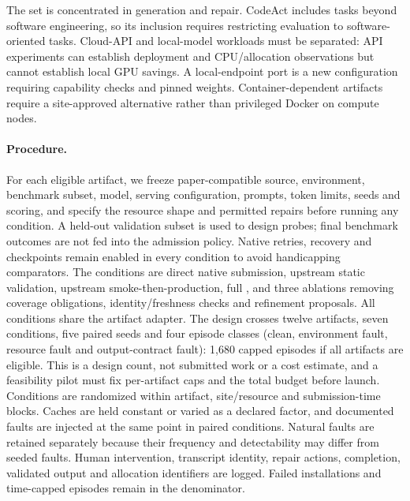 The set is concentrated in generation and repair. CodeAct includes tasks beyond software engineering, so its inclusion requires restricting evaluation to software-oriented tasks. Cloud-API and local-model workloads must be separated: API experiments can establish deployment and CPU/allocation observations but cannot establish local GPU savings. A local-endpoint port is a new configuration requiring capability checks and pinned weights. Container-dependent artifacts require a site-approved alternative rather than privileged Docker on compute nodes.

\paragraph{Procedure.} For each eligible artifact, we freeze paper-compatible source, environment, benchmark subset, model, serving configuration, prompts, token limits, seeds and scoring, and specify the resource shape and permitted repairs before running any condition. A held-out validation subset is used to design probes; final benchmark outcomes are not fed into the admission policy. Native retries, recovery and checkpoints remain enabled in every condition to avoid handicapping comparators. The conditions are direct native submission, upstream static validation, upstream smoke-then-production, full \tool{}, and three ablations removing coverage obligations, identity/freshness checks and refinement proposals. All conditions share the artifact adapter. The design crosses twelve artifacts, seven conditions, five paired seeds and four episode classes (clean, environment fault, resource fault and output-contract fault): 1,680 capped episodes if all artifacts are eligible. This is a design count, not submitted work or a cost estimate, and a feasibility pilot must fix per-artifact caps and the total budget before launch. Conditions are randomized within artifact, site/resource and submission-time blocks. Caches are held constant or varied as a declared factor, and documented faults are injected at the same point in paired conditions. Natural faults are retained separately because their frequency and detectability may differ from seeded faults. Human intervention, transcript identity, repair actions, completion, validated output and allocation identifiers are logged. Failed installations and time-capped episodes remain in the denominator.

